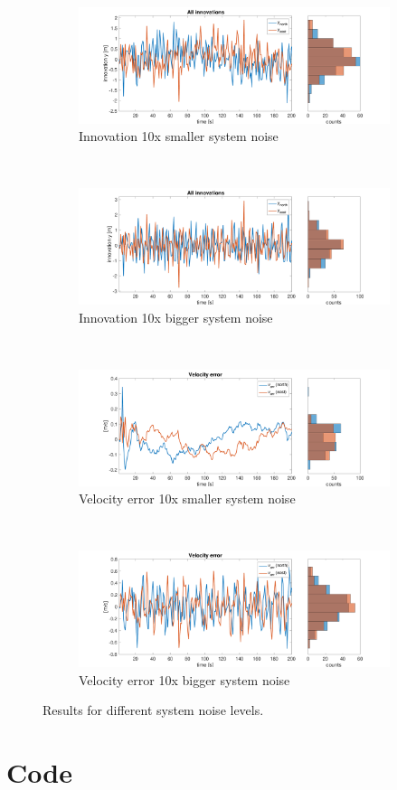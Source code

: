 \documentclass{article}
\begin{document}
\begin{figure}[H]
\begin{subfigure}[t]{0.49\textwidth}
        \centering
        \includegraphics[width=\textwidth]{dt1_smaller_motion_noise/innovation_all}
        \caption{Innovation 10x smaller system noise}
    \end{subfigure}
    ~
    \begin{subfigure}[t]{0.49\textwidth}
        \centering
        \includegraphics[width=\textwidth]{dt1_bigger_motion_noise/innovation_all}
        \caption{Innovation 10x bigger system noise}
    \end{subfigure}
    ~
    \begin{subfigure}[t]{0.49\textwidth}
        \centering
        \includegraphics[width=\textwidth]{dt1_smaller_motion_noise/velocity_error}
        \caption{Velocity error 10x smaller system noise}
    \end{subfigure}
    ~
    \begin{subfigure}[t]{0.49\textwidth}
        \centering
        \includegraphics[width=\textwidth]{dt1_bigger_motion_noise/velocity_error}
        \caption{Velocity error 10x bigger system noise}
    \end{subfigure}
    \caption{Results for different system noise levels.}
    \label{fig:traj_motion_noise}
\end{figure}

\newpage
\section*{Code}

\end{document}
